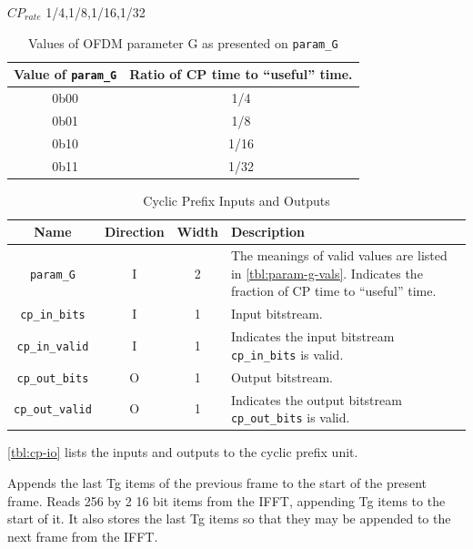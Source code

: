 \documentclass[dvips,10pt,twocolumn]{article}
\newcommand{\wire}{\texttt}
\begin{document}
$CP_{rate}$ 1/4,1/8,1/16,1/32
	
	
	
	\begin{table}
	\begin{tabulary}{\linewidth}{C|C}
		\label{tbl:param-g-vals}
		Value of \wire{param\_G} & Ratio of CP time to
		``useful'' time. \\ \hline

		0b00 & 1/4 \\
		0b01 & 1/8 \\
		0b10 & 1/16 \\
		0b11 & 1/32 \\

	\end{tabulary}
	\caption{Values of OFDM parameter G as presented on
	\wire{param\_G}}
	\end{table}

	\begin{table}
	\begin{tabularx}{\linewidth}{c|c|c|X}
		\label{tbl:cp-io}
		Name & Direction & Width & Description \\ \hline

		\wire{param\_G} & I & 2 & The meanings of valid values
		are listed in \autoref{tbl:param-g-vals}. Indicates the
		fraction of CP time to ``useful'' time.
		\\

		\wire{cp\_in\_bits} & I & 1 & Input bitstream. \\
		
		\wire{cp\_in\_valid} & I & 1 & Indicates the input
		bitstream \wire{cp\_in\_bits} is valid. \\

		\wire{cp\_out\_bits} & O & 1 & Output bitstream. \\

		\wire{cp\_out\_valid} & O & 1 & Indicates the output
		bitstream \wire{cp\_out\_bits} is valid.
	\end{tabularx}
	\caption{Cyclic Prefix Inputs and Outputs}
	\end{table}

	\autoref{tbl:cp-io} lists the inputs and outputs to the cyclic
	prefix unit.

	Appends the last Tg items of the previous frame to the start of the
	present frame.  Reads 256 by 2 16 bit items from the IFFT, appending Tg
	items to the start of it. It also stores the last Tg items so that
	they may be appended to the next frame from the IFFT.
\end{document}
